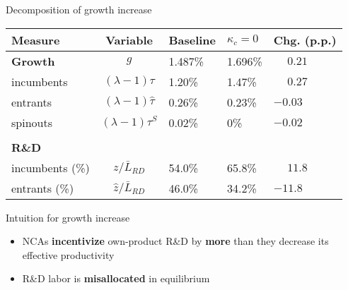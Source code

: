 \documentclass[english,usenames,dvipsnames]{beamer}
\begin{document}
\begin{frame}{Decomposition of growth increase}\label{decomposition_growth_increase}
	\begin{table}
		\centering
		\footnotesize
		\begin{tabular}{lclll}
			\toprule \toprule
			Measure & Variable & Baseline & $\kappa_c = 0$ & Chg. (p.p.) \tabularnewline
			\midrule
			\textbf{Growth} & $g$ & 1.487\% & 1.696\% & $\phantom{-}0.21$\tabularnewline
			\multicolumn{1}{l}{\quad incumbents} & $(\lambda -1) \tau$  & 1.20\% & 1.47\% & $\phantom{-}0.27$ \tabularnewline
			\multicolumn{1}{l}{\quad entrants} & $(\lambda -1) \hat{\tau}$ & 0.26\% & 0.23\% & $-0.03$ \tabularnewline
			\multicolumn{1}{l}{\quad spinouts} & $(\lambda -1) \tau^S$ & 0.02\% & 0\% & $-0.02$\tabularnewline
			\tabularnewline
			\textbf{R\&D} & & & & 
			\tabularnewline
			\multicolumn{1}{l}{\quad incumbents (\%)}  & $z / \bar{L}_{RD}$ & 54.0\% & 65.8\% & $\phantom{-}11.8$ \tabularnewline 
			
			\multicolumn{1}{l}{\quad entrants (\%)}  & $\hat{z} / \bar{L}_{RD}$ & 46.0\% & 34.2\% & $-11.8$ \tabularnewline
			\bottomrule
		\end{tabular}
	\end{table}
	\hyperlink{plots:reducing_kappa_c1}{}
	\hyperlink{plots:reducing_kappa_c2}{}
	\hyperlink{robustness_to_moments}{} \hyperlink{robustness_to_parameters}{}
	\hyperlink{reducing_kappa_c_table:entry_costs_as_transfers}{}
	\hyperlink{reducing_kappa_c_table:incumbentDRS}{}
	\hyperlink{efficiency}{}
\end{frame}

\begin{frame}{Intuition for growth increase}\label{reducing_kappa_c_intuition_overview}
	\begin{itemize}
		\item  NCAs \alert{\textbf{incentivize}} own-product R\&D by \alert{\textbf{more}} than they decrease its effective productivity \hyperlink{disincentive_outweighs_main}{}
		\medskip
		\item  R\&D labor is \alert{\textbf{misallocated}} in equilibrium
	\end{itemize}
\end{frame}
\end{document}

